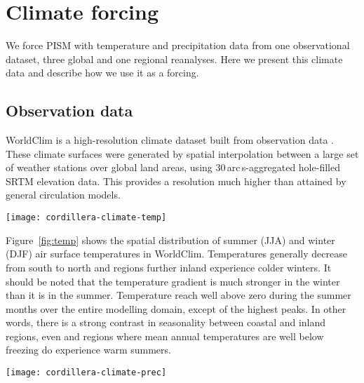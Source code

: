 
\section{Climate forcing}
\label{sec:climate}

We force PISM with temperature and precipitation data from one observational dataset, three global and one regional reanalyses. Here we present this climate data and describe how we use it as a forcing.

\subsection{Observation data}

WorldClim is a high-resolution climate dataset built from observation data \citep{data:worldclim}. These climate surfaces were generated by spatial interpolation between a large set of weather stations over global land areas, using 30\,arc\,s-aggregated hole-filled SRTM elevation data. This provides a resolution much higher than attained by general circulation models.

\begin{figure*}[t]
	\vspace*{2mm}
	\begin{center}
		\texttt{[image: cordillera-climate-temp]}
	\end{center}
	\caption{Summer temperature maps from the five datasets used in this study and winter temperature map from the WorldClim dataset.}
	\label{fig:temp}
\end{figure*}

Figure~\ref{fig:temp} shows the spatial distribution of summer (JJA) and winter (DJF) air surface temperatures in WorldClim. Temperatures generally decrease from south to north and regions further inland experience colder winters. It should be noted that the temperature gradient is much stronger in the winter than it is in the summer. Temperature reach well above zero during the summer months over the entire modelling domain, except of the highest peaks. In other words, there is a strong contrast in seasonality between coastal and inland regions, even and regions where mean annual temperatures are well below freezing do experience warm summers.

\begin{figure*}[t]
	\vspace*{2mm}
	\begin{center}
		\texttt{[image: cordillera-climate-prec]}
	\end{center}
	\caption{Winter precipitation rate maps from the five datasets used in this study and summer precipitation map from the WorldClim dataset.}
	\label{fig:prec}
\end{figure*}

